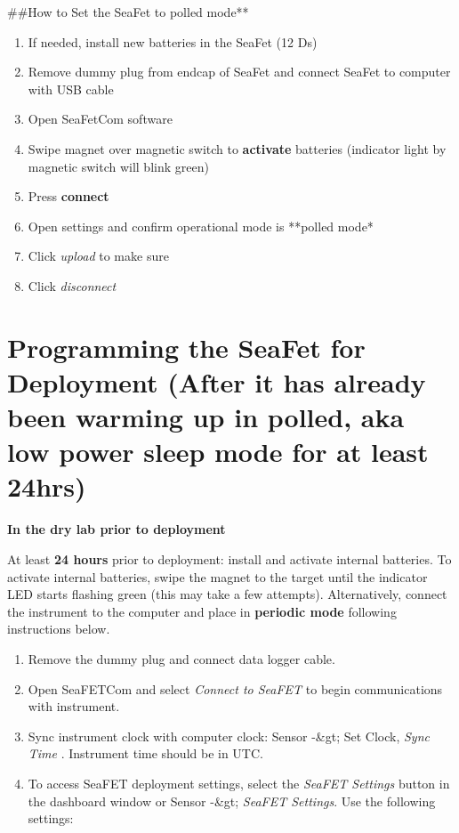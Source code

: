 \documentclass[
]{book}
\providecommand{\tightlist}{%
  \setlength{\itemsep}{0pt}\setlength{\parskip}{0pt}}
\begin{document}
\#\#How to Set the SeaFet to polled mode**

\begin{enumerate}
\def\labelenumi{\arabic{enumi}.}
\tightlist
\item
  If needed, install new batteries in the SeaFet (12 Ds)
\item
  Remove dummy plug from endcap of SeaFet and connect SeaFet to computer with USB cable
\item
  Open SeaFetCom software
\item
  Swipe magnet over magnetic switch to \textbf{activate} batteries (indicator light by magnetic switch will blink green)
\item
  Press \textbf{connect}
\item
  Open settings and confirm operational mode is **polled mode*
\item
  Click \emph{upload} to make sure
\item
  Click \emph{disconnect}
\end{enumerate}

\hypertarget{programming-the-seafet-for-deployment-after-it-has-already-been-warming-up-in-polled-aka-low-power-sleep-mode-for-at-least-24hrs}{%
\section{Programming the SeaFet for Deployment (After it has already been warming up in polled, aka low power sleep mode for at least 24hrs)}\label{programming-the-seafet-for-deployment-after-it-has-already-been-warming-up-in-polled-aka-low-power-sleep-mode-for-at-least-24hrs}}

\textbf{In the dry lab prior to deployment}

At least \textbf{24 hours} prior to deployment: install and activate internal batteries. To activate internal batteries, swipe the magnet to the target until the indicator LED starts flashing green (this may take a few attempts). Alternatively, connect the instrument to the computer and place in \textbf{periodic mode} following instructions below.

\begin{enumerate}
\def\labelenumi{\arabic{enumi}.}
\item
  Remove the dummy plug and connect data logger cable.
\item
  Open SeaFETCom and select \emph{Connect to SeaFET} to begin communications with instrument.
\item
  Sync instrument clock with computer clock: Sensor -\&gt; Set Clock, \emph{Sync Time} . Instrument time should be in UTC.
\item
  To access SeaFET deployment settings, select the \emph{SeaFET Settings} button in the dashboard window or Sensor -\&gt; \emph{SeaFET Settings}. Use the following settings:
\end{enumerate}
\end{document}
